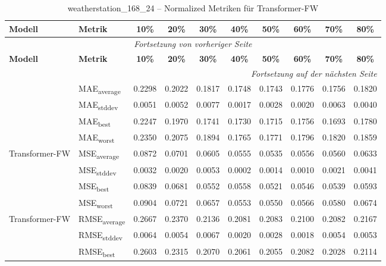 {\small
\begin{longtable}{l l c c c c c c c c}
    \toprule
    \textbf{Modell} & \textbf{Metrik} & \textbf{10\%} & \textbf{20\%} & \textbf{30\%} & \textbf{40\%} & \textbf{50\%} & \textbf{60\%} & \textbf{70\%} & \textbf{80\%} \\
    \midrule
    \endfirsthead
    \multicolumn{10}{c}{\textit{Fortsetzung von vorheriger Seite}} \\
    \toprule
    \textbf{Modell} & \textbf{Metrik} & \textbf{10\%} & \textbf{20\%} & \textbf{30\%} & \textbf{40\%} & \textbf{50\%} & \textbf{60\%} & \textbf{70\%} & \textbf{80\%} \\
    \midrule
    \endhead
    \midrule
    \multicolumn{10}{r}{\textit{Fortsetzung auf der nächsten Seite}} \\
    \midrule
    \endfoot
    \bottomrule
    \caption{weatherstation_168_24 -- Normalized Metriken für Transformer-FW}
    \label{tab:weatherstation_168_24_normalized_transformer-fw}
    \endlastfoot
\multirow{4}{*}{Transformer-FW} & MAE\textsubscript{average} & 0.2298 & 0.2022 & 0.1817 & 0.1748 & 0.1743 & 0.1776 & 0.1756 & 0.1820 \\
 & MAE\textsubscript{stddev} & 0.0051 & 0.0052 & 0.0077 & 0.0017 & 0.0028 & 0.0020 & 0.0063 & 0.0040 \\
 & MAE\textsubscript{best} & 0.2247 & 0.1970 & 0.1741 & 0.1730 & 0.1715 & 0.1756 & 0.1693 & 0.1780 \\
 & MAE\textsubscript{worst} & 0.2350 & 0.2075 & 0.1894 & 0.1765 & 0.1771 & 0.1796 & 0.1820 & 0.1859 \\
\cmidrule(lr){2-10}
\multirow{4}{*}{Transformer-FW} & MSE\textsubscript{average} & 0.0872 & 0.0701 & 0.0605 & 0.0555 & 0.0535 & 0.0556 & 0.0560 & 0.0633 \\
 & MSE\textsubscript{stddev} & 0.0032 & 0.0020 & 0.0053 & 0.0002 & 0.0014 & 0.0010 & 0.0021 & 0.0041 \\
 & MSE\textsubscript{best} & 0.0839 & 0.0681 & 0.0552 & 0.0558 & 0.0521 & 0.0546 & 0.0539 & 0.0593 \\
 & MSE\textsubscript{worst} & 0.0904 & 0.0721 & 0.0657 & 0.0553 & 0.0550 & 0.0566 & 0.0580 & 0.0674 \\
\cmidrule(lr){2-10}
\multirow{4}{*}{Transformer-FW} & RMSE\textsubscript{average} & 0.2667 & 0.2370 & 0.2136 & 0.2081 & 0.2083 & 0.2100 & 0.2082 & 0.2167 \\
 & RMSE\textsubscript{stddev} & 0.0064 & 0.0054 & 0.0067 & 0.0020 & 0.0028 & 0.0018 & 0.0054 & 0.0053 \\
 & RMSE\textsubscript{best} & 0.2603 & 0.2315 & 0.2070 & 0.2061 & 0.2055 & 0.2082 & 0.2028 & 0.2114 \\

\end{longtable}}
